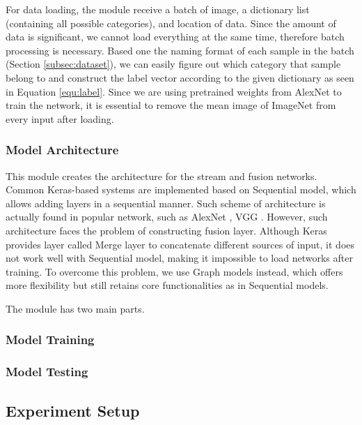 For data loading, the module receive a batch of image, a dictionary list (containing all possible categories), and location of data. Since the amount of data is significant, we cannot load everything at the same time, therefore batch processing is necessary. Based one the naming format of each sample in the batch (Section \ref{subsec:dataset}), we can easily figure out which category that sample belong to and construct the label vector according to the given dictionary
as seen in Equation \ref{equ:label}. Since we are using pretrained weights from AlexNet to train the network, it is essential to remove the mean image of ImageNet from every input after loading.

\subsubsection{Model Architecture}
This module creates the architecture for the stream and fusion networks. Common Keras-based systems are implemented based on Sequential model, which allows adding layers in a sequential manner. Such scheme of architecture is actually found in popular network, such as AlexNet \cite{Krizhevsky2012_alexnet}, VGG \cite{Simonyan2014_vgg}. However, such architecture faces the problem of constructing fusion layer. Although Keras provides layer called Merge layer to concatenate different sources of input, it does not work well with Sequential model, making it impossible to load networks after training. To overcome this problem, we use Graph models instead, which offers more flexibility but still retains core functionalities as in Sequential models.

The module has two main parts.

\subsubsection{Model Training}

\subsubsection{Model Testing}


\subsection{Experiment Setup}

